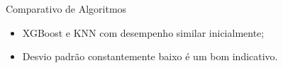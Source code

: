 \documentclass{beamer}
\begin{document}
\begin{frame}{Comparativo de Algoritmos}
    
\begin{table}
\centering
\caption{\emph{Macro F1 Scores} alcançadas pelos algoritmos}
\vspace*{-0.5cm}
\end{table}

    \begin{itemize}
        \setlength{\itemsep}{10pt}
        \item XGBoost e KNN com desempenho similar inicialmente;
        \item Desvio padrão constantemente baixo é um bom indicativo.
    \end{itemize}
    
\end{frame}
\end{document}

